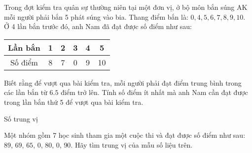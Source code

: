 \begin{vd}%
	Trong đợt kiểm tra quân sự thường niên tại một đơn vị, ở bộ môn bắn súng AK mỗi người phải bắn 5 phát súng vào bia. Thang điểm bắn là: $0, 4,5,6,7,8,9,10$. Ở 4 lần bắn trước đó, anh Nam đã đạt được số điểm như sau:
	\begin{center}
	\begin{tabular}{|c|c|c|c|c|c|}
			\hline
			Lần bắn & 1 & 2 & 3 & 4 & 5\\
			\hline
			Số điểm & 8 & 7 & 0 & 9 &10 \\
			\hline
	\end{tabular}
	\end{center}
	Biết rằng để vượt qua bài kiểm tra, mỗi người phải đạt điểm trung bình trong các lần bắn từ $6.5$ điểm trở lên. Tính số điểm ít nhất mà anh Nam cần đạt được trong lần bắn thứ 5 để vượt qua bài kiểm tra.
\end{vd}
\begin{dang}{Số trung vị}
	
\end{dang}
\begin{vd}%
	Một nhóm gồm 7 học sinh tham gia một cuộc thi và đạt được số điểm như sau: $89$, $69$, $65$, $0$, $80$, $0$, $90$.
	Hãy tìm trung vị của mẫu số liệu trên.
\end{vd}
